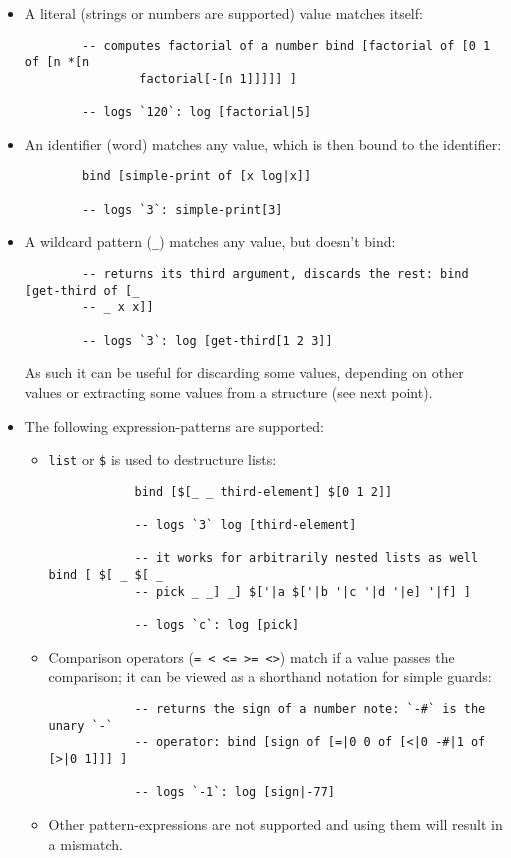 \begin{itemize}
    \item A literal (strings or numbers are supported) value matches itself:
    \begin{lstlisting}
        -- computes factorial of a number bind [factorial of [0 1 of [n *[n
                factorial[-[n 1]]]]] ]
        
        -- logs `120`: log [factorial|5]
    \end{lstlisting}
    \item An identifier (word) matches any value, which is then bound to the
      identifier:
    \begin{lstlisting}
        bind [simple-print of [x log|x]]
        
        -- logs `3`: simple-print[3]
    \end{lstlisting}
    \item A wildcard pattern (\texttt{\_}) matches any value, but doesn't bind:
    \begin{lstlisting}
        -- returns its third argument, discards the rest: bind [get-third of [_
        -- _ x x]]
        
        -- logs `3`: log [get-third[1 2 3]]
    \end{lstlisting}
    As such it can be useful for discarding some values, depending on other
    values or extracting some values from a structure (see next point).
    \item The following expression-patterns are supported:
    \begin{itemize}
        \item \texttt{list} or \texttt{\$} is used to destructure lists:
        \begin{lstlisting}
            bind [$[_ _ third-element] $[0 1 2]]
            
            -- logs `3` log [third-element]
            
            -- it works for arbitrarily nested lists as well bind [ $[ _ $[ _
            -- pick _ _] _] $['|a $['|b '|c '|d '|e] '|f] ]
            
            -- logs `c`: log [pick]
        \end{lstlisting}
        \item Comparison operators (\texttt{= < <= >= <>}) match if a value
          passes the comparison; it can be viewed as a shorthand notation for
          simple
          guards\cite[Chapter~Pattern Matching Basics, Section Using Guards within Patterns]{f_sharp_wikibooks}:
        \begin{lstlisting}
            -- returns the sign of a number note: `-#` is the unary `-`
            -- operator: bind [sign of [=|0 0 of [<|0 -#|1 of [>|0 1]]] ]
            
            -- logs `-1`: log [sign|-77]
        \end{lstlisting}
        \item Other pattern-expressions are not supported and using them will
          result in a mismatch.
    \end{itemize}
\end{itemize}

